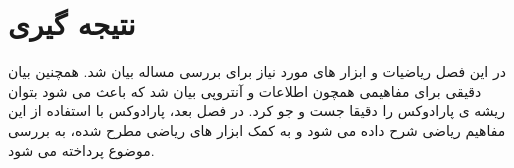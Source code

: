 \section{نتیجه گیری}
در این فصل ریاضیات و ابزار های مورد نیاز برای بررسی مساله بیان شد. همچنین بیان دقیقی برای مفاهیمی همچون اطلاعات و آنتروپی بیان شد که باعث می شود بتوان ریشه ی پارادوکس را دقیقا جست و جو کرد. در فصل بعد، پارادوکس با استفاده از این مفاهیم ریاضی شرح داده می شود و به کمک ابزار های ریاضی مطرح شده، به بررسی موضوع پرداخته می شود.
